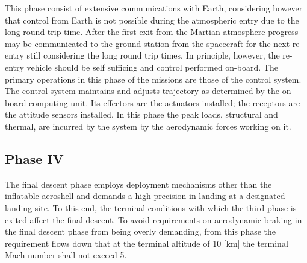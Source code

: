This phase consist of extensive communications with Earth, considering however that control from Earth is not possible during the atmospheric entry due to the long round trip time. After the first exit from the Martian atmosphere progress may be communicated to the ground station from the spacecraft for the next re-entry still considering the long round trip times. In principle, however, the re-entry vehicle should be self sufficing and control performed on-board. The primary operations in this phase of the missions are those of the control system. The control system maintains and adjusts trajectory as determined by the on-board computing unit. Its effectors are the actuators installed; the receptors are the attitude sensors installed. In this phase the peak loads, structural and thermal, are incurred by the system by the aerodynamic forces working on it.

\subsection{Phase IV}\label{sec:p4}
The final descent phase employs deployment mechanisms other than the inflatable aeroshell and demands a high precision in landing at a designated landing site. To this end, the terminal conditions with which the third phase is exited affect the final descent. To avoid requirements on aerodynamic braking in the final descent phase from being overly demanding, from this phase the requirement flows down that at the terminal altitude of 10 [km] the terminal Mach number shall not exceed 5. 

